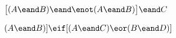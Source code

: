\begin{earg}
\item $\bigl[(A\eand B) \eand\enot(A\eand B)\bigr] \eand C$ \vspace{.5ex}	
%
%
%
%
%
\item $(A \eand B) ]\eif[(A \eand C) \eor (B \eand D)]$ \vspace{.5ex}		
%
%
%


\end{earg}
